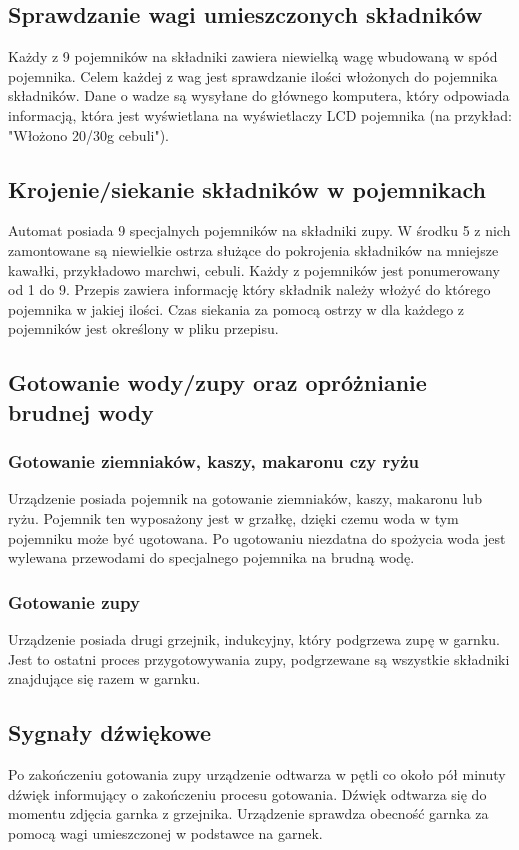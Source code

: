 \documentclass[12pt,a4paper,notitlepage]{report}
\begin{document}
\subsection{Sprawdzanie wagi umieszczonych składników}
Każdy z 9 pojemników na składniki zawiera niewielką wagę wbudowaną w spód pojemnika. Celem każdej z wag jest sprawdzanie ilości włożonych do pojemnika składników. Dane o wadze są wysyłane do głównego komputera, który odpowiada informacją, która jest wyświetlana na wyświetlaczy LCD pojemnika (na przykład: "Włożono 20/30g cebuli").

\subsection{Krojenie/siekanie składników w pojemnikach}
Automat posiada 9 specjalnych pojemników na składniki zupy. W środku 5 z nich zamontowane są niewielkie ostrza służące do pokrojenia składników na mniejsze kawałki, przykładowo marchwi, cebuli. Każdy z pojemników jest ponumerowany od 1 do 9. Przepis zawiera informację który składnik należy włożyć do którego pojemnika w jakiej ilości. Czas siekania za pomocą ostrzy w dla każdego z pojemników jest określony w pliku przepisu.

\subsection{Gotowanie wody/zupy oraz opróżnianie brudnej wody}
\subsubsection{Gotowanie ziemniaków, kaszy, makaronu czy ryżu}
Urządzenie posiada pojemnik na gotowanie ziemniaków, kaszy, makaronu lub ryżu. Pojemnik ten wyposażony jest w grzałkę, dzięki czemu woda w tym pojemniku może być ugotowana. Po ugotowaniu niezdatna do spożycia woda jest wylewana przewodami do specjalnego pojemnika na brudną wodę.

\subsubsection{Gotowanie zupy}
Urządzenie posiada drugi grzejnik, indukcyjny, który podgrzewa zupę w garnku. Jest to ostatni proces przygotowywania zupy, podgrzewane są wszystkie składniki znajdujące się razem w garnku.

\subsection{Sygnały dźwiękowe}
Po zakończeniu gotowania zupy urządzenie odtwarza w pętli co około pół minuty dźwięk informujący o zakończeniu procesu gotowania. Dźwięk odtwarza się do momentu zdjęcia garnka z grzejnika. Urządzenie sprawdza obecność garnka za pomocą wagi umieszczonej w podstawce na garnek.
\end{document}

